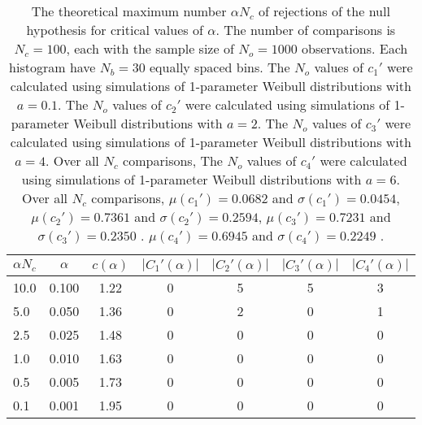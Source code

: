 \begin{table}[h!]
\begin{center}
\begin{tabular}{| l | c | c | c | c | c | c |}\hline
$\alpha N_c$ & $\alpha$ & $c(\alpha)$ & $|C_1'(\alpha)|$ & $|C_2'(\alpha)|$ & $|C_3'(\alpha)|$ & $|C_4'(\alpha)|$ \\\hline
10.0 & 0.100 & 1.22 & 0 & 5 & 5 & 3 \\\hline
5.0 & 0.050 & 1.36 & 0 & 2 & 0 & 1 \\\hline
2.5 & 0.025 & 1.48 & 0 & 0 & 0 & 0 \\\hline
1.0 & 0.010 & 1.63 & 0 & 0 & 0 & 0 \\\hline
0.5 & 0.005 & 1.73 & 0 & 0 & 0 & 0 \\\hline
0.1 & 0.001 & 1.95 & 0 & 0 & 0 & 0 \\\hline
\end{tabular}
\caption{The theoretical maximum number $\alpha N_c$ of rejections
of the null hypothesis for critical values of $\alpha$.
The number of comparisons is $N_c=100$,
each with the sample size of $N_o=1000$ observations.
Each histogram have $N_b=30$ equally spaced bins.
The $N_o$ values of $c_1'$ were calculated using simulations of
 1-parameter Weibull distributions with $a=0.1$.
The $N_o$ values of $c_2'$ were calculated using simulations of
 1-parameter Weibull distributions with $a=2$.
The $N_o$ values of $c_3'$ were calculated using simulations of
 1-parameter Weibull distributions with $a=4$.
Over all $N_c$ comparisons,
The $N_o$ values of $c_4'$ were calculated using simulations of
 1-parameter Weibull distributions with $a=6$.
Over all $N_c$ comparisons,
 $\mu(c_1')=0.0682$ and $\sigma(c_1')=0.0454$,
 $\mu(c_2')=0.7361$ and $\sigma(c_2')=0.2594$,
 $\mu(c_3')=0.7231$ and $\sigma(c_3')=0.2350$ .
 $\mu(c_4')=0.6945$ and $\sigma(c_4')=0.2249$ .
}
\end{center}
\end{table}